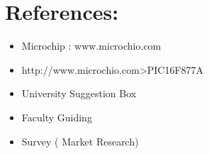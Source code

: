 \documentclass[]{article}
\begin{document}
\section{References:}
\begin{itemize}
	\item Microchip : www.microchio.com
	\item http://www.microchio.com>PIC16F877A
	\item University Suggestion Box
	\item Faculty Guiding
	\item Survey ( Market Research)
\end{itemize}
\end{document}
